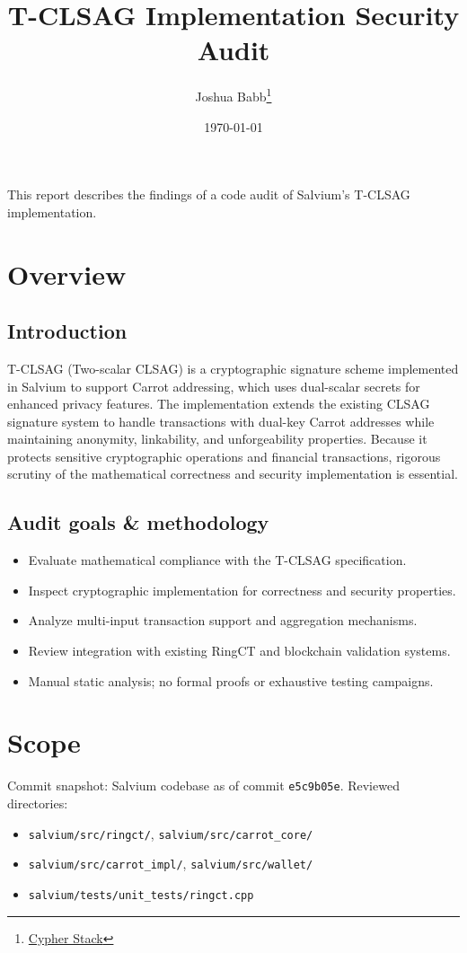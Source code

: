 \documentclass{article}
\title{T-CLSAG Implementation Security Audit}
\author{Joshua Babb\thanks{\url{Cypher Stack}}}
\date{\today}
\begin{document}
\maketitle

This report describes the findings of a code audit of Salvium's T-CLSAG implementation.

\tableofcontents

\section{Overview}
\subsection{Introduction}
T-CLSAG (Two-scalar CLSAG) is a cryptographic signature scheme implemented in 
Salvium to support Carrot addressing, which uses dual-scalar secrets for enhanced 
privacy features.  The implementation extends the existing CLSAG signature system 
to handle transactions with dual-key Carrot addresses while maintaining anonymity, 
linkability, and unforgeability properties.  Because it protects sensitive 
cryptographic operations and financial transactions, rigorous scrutiny of the 
mathematical correctness and security implementation is essential.

\subsection{Audit goals \& methodology}
\begin{itemize}
  \item Evaluate mathematical compliance with the T-CLSAG specification.
  \item Inspect cryptographic implementation for correctness and security properties.
  \item Analyze multi-input transaction support and aggregation mechanisms.
  \item Review integration with existing RingCT and blockchain validation systems.
  \item Manual static analysis; no formal proofs or exhaustive testing campaigns.
\end{itemize}

\section{Scope}
Commit snapshot: Salvium codebase as of commit \texttt{e5c9b05e}.  Reviewed directories:
\begin{itemize}
  \item \texttt{salvium/src/ringct/}, \texttt{salvium/src/carrot\_core/}
  \item \texttt{salvium/src/carrot\_impl/}, \texttt{salvium/src/wallet/}
  \item \texttt{salvium/tests/unit\_tests/ringct.cpp}
\end{itemize}
\end{document}
